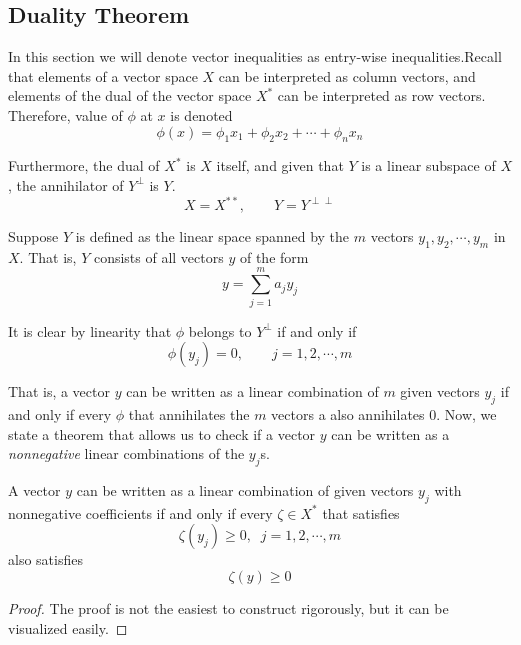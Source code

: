 \subsection{Duality Theorem}

  In this section we will denote vector inequalities as entry-wise inequalities.Recall that elements of a vector space $X$ can be interpreted as column vectors, and elements of the dual of the vector space $X^\ast$ can be interpreted as row vectors. Therefore, value of $\phi$ at $x$ is denoted
  \begin{equation}
    \phi (x) = \phi_1 x_1 + \phi_2 x_2 + \cdots + \phi_n x_n
  \end{equation}

  Furthermore, the dual of $X^\ast$ is $X$ itself, and given that $Y$ is a linear subspace of $X$, the annihilator of $Y^\perp$ is $Y$. 
  \begin{equation}
    X = X^{**}, \qquad Y = Y^{\perp\perp}
  \end{equation}

  Suppose $Y$ is defined as the linear space spanned by the $m$ vectors $y_1, y_2, \cdots, y_m$ in $X$. That is, $Y$ consists of all vectors $y$ of the form
  \begin{equation}
    y = \sum_{j=1}^m a_j y_j
  \end{equation}

  It is clear by linearity that $\phi$ belongs to $Y^\perp$ if and only if
  \begin{equation}
    \phi (y_j) = 0, \qquad j = 1, 2, \cdots, m
  \end{equation}

  That is, a vector $y$ can be written as a linear combination of $m$ given vectors $y_j$ if and only if every $\phi$ that annihilates the $m$ vectors a also annihilates $0$. Now, we state a theorem that allows us to check if a vector $y$ can be written as a \textit{nonnegative} linear combinations of the $y_j$s. 

  \begin{theorem}
    A vector $y$ can be written as a linear combination of given vectors $y_j$ with nonnegative coefficients if and only if every $\zeta \in X^\ast$ that satisfies 
    \begin{equation}
       \zeta (y_j) \geq 0, \;\; j = 1, 2, \cdots, m
    \end{equation}
    also satisfies 
    \begin{equation}
      \zeta (y) \geq 0
    \end{equation}
  \end{theorem}
  \begin{proof}
    The proof is not the easiest to construct rigorously, but it can be visualized easily. 
  \end{proof}

